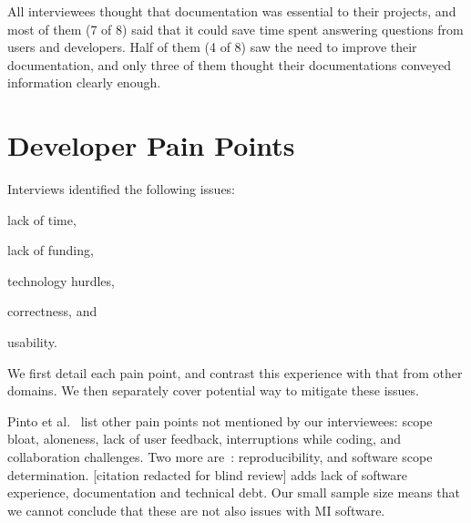 \documentclass[doubleblind,12pt, 3p, times]{elsarticle}
\begin{document}
All interviewees thought that documentation was
essential to their projects, and most of them (7 of 8) said that it could save
time spent answering questions from users and developers. Half of them (4 of 8)
saw the need to improve their documentation, and only three of them thought 
their documentations conveyed information clearly enough.

\section{Developer Pain Points} \label{painpoints}

Interviews identified the following issues:
\begin{enumerate*}
\item lack of time,
\item lack of funding,
\item technology hurdles, 
\item correctness, and 
\item usability.  
\end{enumerate*}
We first detail each pain point, and contrast this experience with that
from other domains. We then separately cover potential way to mitigate these
issues.

Pinto et al.~\cite{PintoEtAl2018} list other pain points not mentioned by our
interviewees: scope bloat, aloneness, lack of user feedback, interruptions while
coding, and collaboration challenges. Two more are~\cite{WieseEtAl2019}:
reproducibility, and software scope determination.  [citation redacted for blind
review] %
adds lack of software experience, documentation and technical debt.  Our small
sample size means that we cannot conclude that these are not also issues with MI
software.
\end{document}
